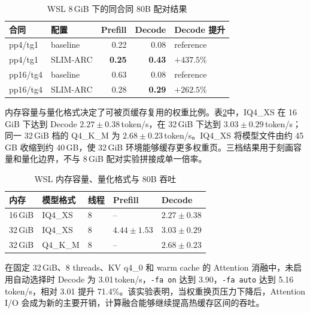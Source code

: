 \begin{table}[H]
  \centering
  \small
  \caption{WSL 8\,GiB 下的同合同 80B 配对结果}
  \label{tab:wsl-limited}
  \begin{tabular}{llrrl}
    \toprule
    合同 & 配置 & Prefill & Decode & Decode 提升 \\
    \midrule
    pp4/tg1 & baseline & 0.22 & 0.08 & reference \\
    pp4/tg1 & SLIM-ARC & \textbf{0.25} & \textbf{0.43} & \textbf{$+437.5\%$} \\
    pp16/tg4 & baseline & 0.63 & 0.08 & reference \\
    pp16/tg4 & SLIM-ARC & 0.28 & \textbf{0.29} & \textbf{$+262.5\%$} \\
    \bottomrule
  \end{tabular}
\end{table}

内存容量与量化格式决定了可被页缓存复用的权重比例。表\ref{tab:wsl-capacity}中，IQ4\_XS 在 16\,GiB 下达到 Decode $2.27\pm0.38$\,token/s，在 32\,GiB 下达到 $3.03\pm0.29$\,token/s；同一 32\,GiB 档的 Q4\_K\_M 为 $2.68\pm0.23$\,token/s。IQ4\_XS 将模型文件由约 45\,GB 收缩到约 40\,GB，使 32\,GiB 环境能够缓存更多权重页。三档结果用于刻画容量和量化边界，不与 8\,GiB 配对实验拼接成单一倍率。

\begin{table}[H]
  \centering
  \small
  \caption{WSL 内存容量、量化格式与 80B 吞吐}
  \label{tab:wsl-capacity}
  \begin{tabular}{lllll}
    \toprule
    内存 & 模型格式 & 线程 & Prefill & Decode \\
    \midrule
    16\,GiB & IQ4\_XS & 8 & -- & $2.27\pm0.38$ \\
    32\,GiB & IQ4\_XS & 8 & $4.44\pm1.53$ & $3.03\pm0.29$ \\
    32\,GiB & Q4\_K\_M & 8 & -- & $2.68\pm0.23$ \\
    \bottomrule
  \end{tabular}
\end{table}

在固定 32\,GiB、8 threads、KV q4\_0 和 warm cache 的 Attention 消融中，未启用自动选择时 Decode 为 3.01\,token/s，\texttt{-fa on} 达到 3.90，\texttt{-fa auto} 达到 5.16\,token/s，相对 3.01 提升 71.4\%。该实验表明，当权重换页压力下降后，Attention I/O 会成为新的主要开销，计算融合能够继续提高热缓存区间的吞吐。

